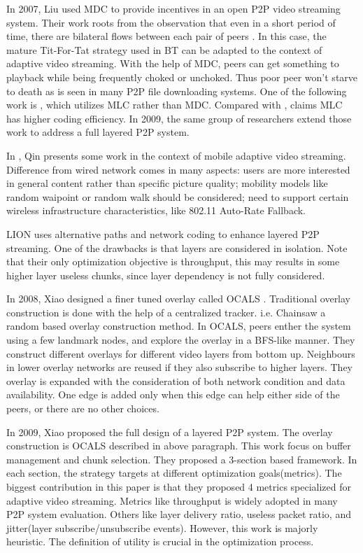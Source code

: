\documentclass[11pt,a4paper]{article}
\begin{document}
In 2007, Liu used MDC to provide incentives in an open 
P2P video streaming system\cite{liu2007p2p-mdc}.
Their work roots from the observation that even in a short period
of time, there are bilateral flows between each pair of peers
\cite{hei2007measurement}. In this case, the mature 
Tit-For-Tat strategy used in BT can be adapted to the context
of adaptive video streaming. With the help of MDC, peers 
can get something to playback while being frequently 
choked or unchoked. Thus poor peer won't starve to death 
as is seen in many P2P file downloading systems. 
One of the following work is \cite{liu2007incentive-mlayer}, 
which utilizes MLC rather than MDC. Compared with \cite{liu2007p2p-mdc}, 
\cite{liu2007incentive-mlayer} claims MLC has higher coding 
efficiency. In 2009, the same group of researchers extend
those work to address a full layered P2P system\cite{liu2009layerp2p}. 

In \cite{qin2007improving}, Qin presents some work in the context 
of mobile adaptive video streaming. Difference from wired network
comes in many aspects: users are more interested in general content rather 
than specific picture quality; mobility models like random waipoint 
or random walk should be considered; need to support certain wireless 
infrastructure characteristics, like 802.11 Auto-Rate Fallback. 

LION\cite{zhao2006improving} uses alternative paths and network coding to 
enhance layered
P2P streaming. One of the drawbacks is that layers are considered in isolation. 
Note that their only optimization objective is throughput, this may results 
in some higher layer useless chunks, since layer dependency is not fully 
considered. 

In 2008, Xiao designed a finer tuned overlay called OCALS
\cite{xiao2008ocals}. Traditional overlay construction is 
done with the help of a centralized tracker. i.e. Chainsaw
\cite{pai2005chainsaw} a random based overlay construction 
method. In OCALS, peers enther the system using a few landmark 
nodes, and explore the overlay in a BFS-like manner. They construct
different overlays for different video layers from bottom up. 
Neighbours in lower overlay networks are reused if they also subscribe 
to higher layers. They overlay is expanded with the consideration 
of both network condition and data availability. One edge is added
only when this edge can help either side of the peers, or there are 
no other choices. 

In 2009, Xiao proposed the full design of a layered P2P 
system\cite{xiao2009layerp2p}. The overlay construction is 
OCALS\cite{xiao2008ocals} described in above paragraph. This work
focus on buffer management and chunk selection. They proposed 
a 3-section based framework. In each section, the strategy 
targets at different optimization goals(metrics). The biggest 
contribution in this paper is that they proposed 4 metrics
specialized for adaptive video streaming. Metrics like throughput 
is widely adopted in many P2P system evaluation. Others like 
layer delivery ratio, useless packet ratio, and jitter(layer 
subscribe/unsubscribe events). However, this work is majorly 
heuristic. The definition of utility is crucial in the optimization 
process. 
\end{document}
